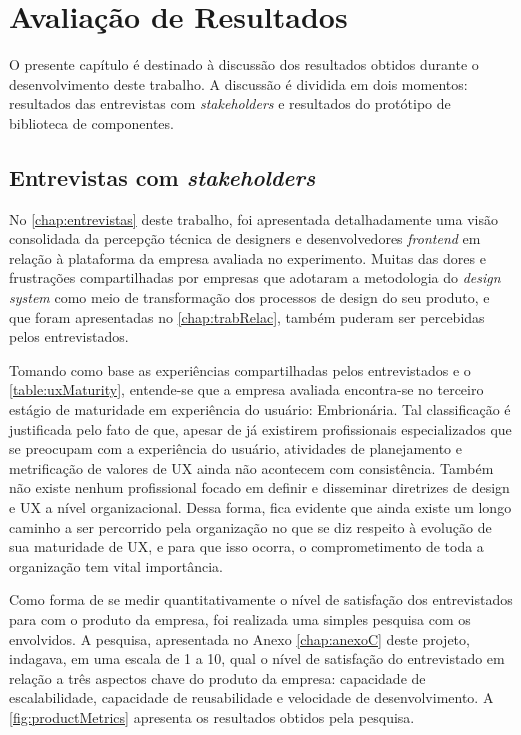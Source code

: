 
\chapter{Avaliação de Resultados}
\label{chap:resultados}

O presente capítulo é destinado à discussão dos resultados obtidos durante o desenvolvimento deste trabalho. A discussão é dividida em dois momentos: resultados das entrevistas com \textit{stakeholders} e resultados do protótipo de biblioteca de componentes.

\section{Entrevistas com \textit{stakeholders}}
\label{sec:resEntrevistas}

No \autoref{chap:entrevistas} deste trabalho, foi apresentada detalhadamente uma visão consolidada da percepção técnica de designers e desenvolvedores \textit{frontend} em relação à plataforma da empresa avaliada no experimento. Muitas das dores e frustrações compartilhadas por empresas que adotaram a metodologia do \textit{design system} como meio de transformação dos processos de design do seu produto, e que foram apresentadas no \autoref{chap:trabRelac}, também puderam ser percebidas pelos entrevistados.

Tomando como base as experiências compartilhadas pelos entrevistados e o \autoref{table:uxMaturity}, entende-se que a empresa avaliada encontra-se no terceiro estágio de maturidade em experiência do usuário: Embrionária. Tal classificação é justificada pelo fato de que, apesar de já existirem profissionais especializados que se preocupam com a experiência do usuário, atividades de planejamento e metrificação de valores de UX ainda não acontecem com consistência. Também não existe nenhum profissional focado em definir e disseminar diretrizes de design e UX a nível organizacional. Dessa forma, fica evidente que ainda existe um longo caminho a ser percorrido pela organização no que se diz respeito à evolução de sua maturidade de UX, e para que isso ocorra, o comprometimento de toda a organização tem vital importância.

Como forma de se medir quantitativamente o nível de satisfação dos entrevistados para com o produto da empresa, foi realizada uma simples pesquisa com os envolvidos. A pesquisa, apresentada no Anexo \ref{chap:anexoC} deste projeto, indagava, em uma escala de 1 a 10, qual o nível de satisfação do entrevistado em relação a três aspectos chave do produto da empresa: capacidade de escalabilidade, capacidade de reusabilidade e velocidade de desenvolvimento. A \autoref{fig:productMetrics} apresenta os resultados obtidos pela pesquisa.

